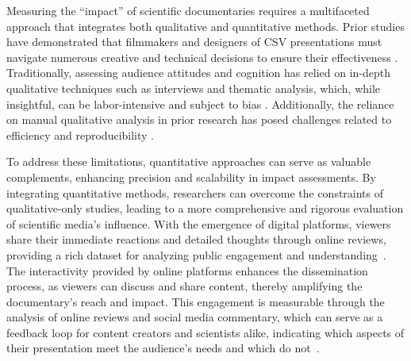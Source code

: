 Measuring the ``impact'' of scientific documentaries requires a multifaceted approach that integrates both qualitative and quantitative methods. 
%
Prior studies have demonstrated that filmmakers and designers of CSV presentations must navigate numerous creative and technical decisions to ensure their effectiveness \citep{woodward2015one,borkiewicz2022introducing,jensen2023evidence}.
%
Traditionally, assessing audience attitudes and cognition has relied on in-depth qualitative techniques such as interviews and thematic analysis, which, while insightful, can be labor-intensive and subject to bias \citep{chen2005top,cawthon2007effect,buck2013effect,fraser2012giant,smith2015aesthetics,smith2017capturing,jensen2023evidence,jenseninprep}. 
Additionally, the reliance on manual qualitative analysis in prior research has posed challenges related to efficiency and reproducibility \citep{bieniek2019communicating,atakav2024impact,barrett2008assessing}.

To address these limitations, quantitative approaches can serve as valuable complements, enhancing precision and scalability in impact assessments.
By integrating quantitative methods, researchers can overcome the constraints of qualitative-only studies, leading to a more comprehensive and rigorous evaluation of scientific media's influence.
With the emergence of digital platforms, viewers share their immediate reactions and detailed thoughts through online reviews, providing a rich dataset for analyzing public engagement and understanding~\cite [e.g.,][]{APPEL2016110}.
The interactivity provided by online platforms enhances the dissemination process, as viewers can discuss and share content, thereby amplifying the documentary's reach and impact. This engagement is measurable through the analysis of online reviews and social media commentary, which can serve as a feedback loop for content creators and scientists alike, indicating which aspects of their presentation meet the audience's needs and which do not~\cite{rezapour2017classification,bouzoubaa2024euphoria}.


